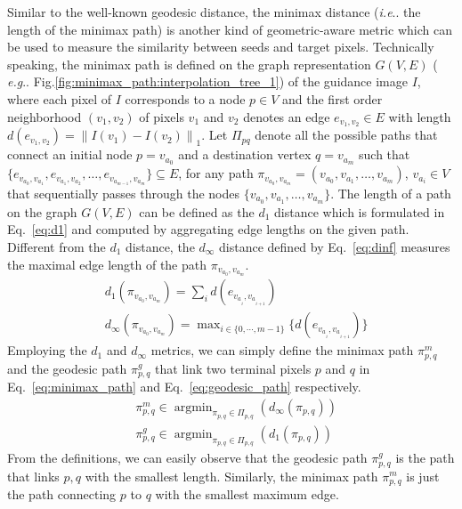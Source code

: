 \documentclass[preprint,10pt,5p,times,twocolumn]{elsarticle}
\makeatletter
\DeclareRobustCommand\onedot{\futurelet\@let@token\@onedot}
\def\@onedot{\ifx\@let@token.\else.\null\fi\xspace}
\def\eg{\emph{e.g}\onedot} \def\Eg{\emph{E.g}\onedot}
\def\ie{\emph{i.e}\onedot} \def\Ie{\emph{I.e}\onedot}
\makeatother
\begin{document}
Similar to the well-known geodesic distance, the minimax distance (\ie the length of the minimax path) is another kind of geometric-aware metric which can be used to measure the similarity between seeds and target pixels. Technically speaking, the minimax path is defined on the graph representation $G(V, E)$ ( \eg Fig.\ref{fig:minimax_path:interpolation_tree_1}) of the guidance image $I$, where each pixel of $I$ corresponds to a node $p \in V$ and the first order neighborhood $(v_1, v_2)$ of pixels $v_1$ and $v_2$ denotes an edge $e_{v_1, v_2} \in E$ with length $d(e_{v_1, v_2}) = {\left\| {I({v_1}) - I({v_2})} \right\|_1} $. Let ${\Pi _{pq}}$ denote all the possible paths that connect an initial node $p = v_{{a_0}}$ and a destination vertex $q = v_{{a_m}}$ such that $\{ {{e_{{v_{{a_0}}},{v_{{a_1}}}}},{e_{{v_{{a_1}}},{v_{{a_2}}}}}, \ldots ,{e_{{v_{{a_{m - 1}}}},{v_{{a_m}}}}}} \} \subseteq E$, for any path $\pi_{v_{{a_0}}, v_{{a_m}}}  = ({v_{{a_0}}},{v_{{a_1}}}, \ldots ,{v_{{a_m}}})$, $v_{{a_i}} \in V$ that sequentially passes through the nodes $\{{v_{{a_0}}},{v_{{a_1}}}, \ldots ,{v_{{a_m}}}\}$. The length of a path on the graph $G(V, E)$ can be defined as the $d_1$ distance which is formulated in Eq.~\eqref{eq:d1} and computed by aggregating edge lengths on the given path. Different from the $d_1$ distance, the $d_\infty$ distance defined by Eq.~\eqref{eq:dinf} measures the maximal edge length of the path $\pi_{v_{{a_0}}, v_{{a_m}}}$.
%
\begin{align}
&{d_1(\pi_{v_{{a_0}}, v_{{a_m}}})} = \sum\nolimits_i {d({e_{{v_a}_{_i},{v_a}_{_{i + 1}}}})} \label{eq:d1}\\
&{d_\infty(\pi_{v_{{a_0}}, v_{{a_m}}}) } = \max\nolimits_{i \in \{0,\cdots,m-1\}} \{ d({e_{{v_a}_{_i},{v_a}_{_{i+1}}}})\}  \label{eq:dinf}
\end{align}
%
Employing the $d_1$ and $d_\infty$ metrics, we can simply define the minimax path $\pi^m_{p,q}$ and the geodesic path ${\pi^g_{{p},{q}}}$ that link two terminal pixels $p$ and $q$ in Eq.~\eqref{eq:minimax_path} and Eq.~\eqref{eq:geodesic_path} respectively.
%
\begin{align}
&{\pi^m_{{p},{q}}} \in \mathop {\arg \min }\nolimits_{\pi_{{p},{q}} \in {\Pi _{{p},{q}}}} ({d_\infty }(\pi_{{p},{q}}))  \label{eq:minimax_path}  \\
& {\pi^g_{{p},{q}}} \in \mathop {\arg \min }\nolimits_{\pi_{{p},{q}} \in {\Pi _{{p},{q}}}} ({d_1 }(\pi_{{p},{q}})) \label{eq:geodesic_path}
\end{align}
%
From the definitions, we can easily observe that the geodesic path $\pi^g_{{p},{q}}$ is the path that links $p, q$ with the smallest length. Similarly, the minimax path $\pi^m_{{p},{q}}$  is just the path connecting $p$ to $q$ with the smallest maximum edge.
\end{document}
